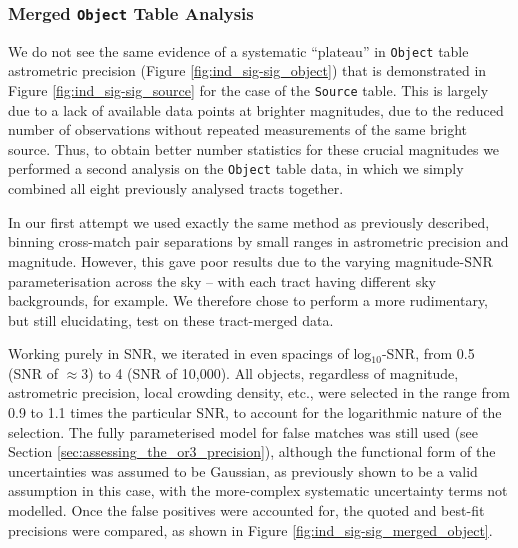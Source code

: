 \documentclass[SE,lsstdraft,authoryear,toc]{lsstdoc}
\begin{document}
\subsubsection{Merged \texttt{Object} Table Analysis}
We do not see the same evidence of a systematic ``plateau'' in \texttt{Object} table astrometric precision (Figure \ref{fig:ind_sig-sig_object}) that is demonstrated in Figure \ref{fig:ind_sig-sig_source} for the case of the \texttt{Source} table.
This is largely due to a lack of available data points at brighter magnitudes, due to the reduced number of observations without repeated measurements of the same bright source.
Thus, to obtain better number statistics for these crucial magnitudes we performed a second analysis on the \texttt{Object} table data, in which we simply combined all eight previously analysed tracts together.

In our first attempt we used exactly the same method as previously described, binning cross-match pair separations by small ranges in astrometric precision and magnitude.
However, this gave poor results due to the varying magnitude-SNR parameterisation across the sky -- with each tract having different sky backgrounds, for example.
We therefore chose to perform a more rudimentary, but still elucidating, test on these tract-merged data.

Working purely in SNR, we iterated in even spacings of log$_{10}$-SNR, from 0.5 (SNR of $\approx3$) to 4 (SNR of 10,000).
All objects, regardless of magnitude, astrometric precision, local crowding density, etc., were selected in the range from 0.9 to 1.1 times the particular SNR, to account for the logarithmic nature of the selection.
The fully parameterised model for false matches was still used (see Section \ref{sec:assessing_the_or3_precision}), although the functional form of the uncertainties was assumed to be Gaussian, as previously shown to be a valid assumption in this case, with the more-complex systematic uncertainty terms not modelled.
Once the false positives were accounted for, the quoted and best-fit precisions were compared, as shown in Figure \ref{fig:ind_sig-sig_merged_object}.
\end{document}
